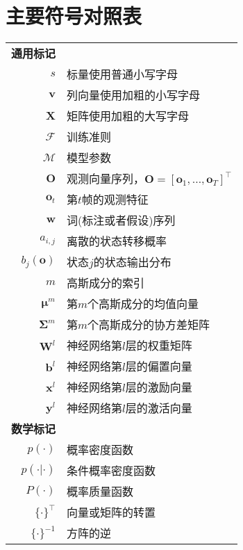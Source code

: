 \chapter{主要符号对照表}
\label{chap:symb}

\begin{longtable}{rl}
\textbf{通用标记} \\
$s$ & 标量使用普通小写字母 \\
$\mathbf{v}$ & 列向量使用加粗的小写字母 \\
$\mathbf{X}$ & 矩阵使用加粗的大写字母 \\
$\mathcal{F}$ & 训练准则 \\
$\mathcal{M}$ & 模型参数 \\
$\mathbf{O}$ & 观测向量序列，$\mathbf{O}=[ \mathbf{o}_1, \dots, \mathbf{o}_T ]^\top$ \\
$\mathbf{o}_t$ & 第$t$帧的观测特征 \\
$\mathbf{w}$ & 词(标注或者假设)序列 \\
$a_{i,j}$ & 离散的状态转移概率 \\
$b_j(\mathbf{o})$ & 状态$j$的状态输出分布 \\
$m$ & 高斯成分的索引 \\
$\bm{\mu}^{m}$ & 第$m$个高斯成分的均值向量 \\
$\bm{\Sigma}^{m}$ & 第$m$个高斯成分的协方差矩阵 \\
$\mathbf{W}^l$ & 神经网络第$l$层的权重矩阵 \\
$\mathbf{b}^l$ & 神经网络第$l$层的偏置向量 \\
$\mathbf{x}^l$ & 神经网络第$l$层的激励向量 \\
$\mathbf{y}^l$ & 神经网络第$l$层的激活向量 \\

\textbf{数学标记} \\
$p(\cdot)$ & 概率密度函数 \\
$p(\cdot|\cdot)$ & 条件概率密度函数 \\
$P(\cdot)$ & 概率质量函数 \\
$\{ \cdot \}^{\top}$ & 向量或矩阵的转置 \\
$\{ \cdot \}^{-1}$ & 方阵的逆 \\



\end{longtable}
